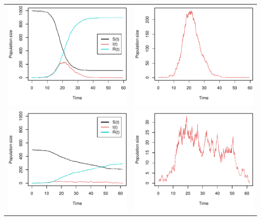 \documentclass{standalone}
\begin{document}
\begin{tabular}{cc}
\includegraphics[width=9cm]{figure1.pdf} & \includegraphics[width=9cm]{figure1_I(t).pdf} \\
\includegraphics[width=9cm]{figure1_2.pdf} & \includegraphics[width=9cm]{figure1_2_I(t).pdf} \\

\end{tabular}
\end{document}
